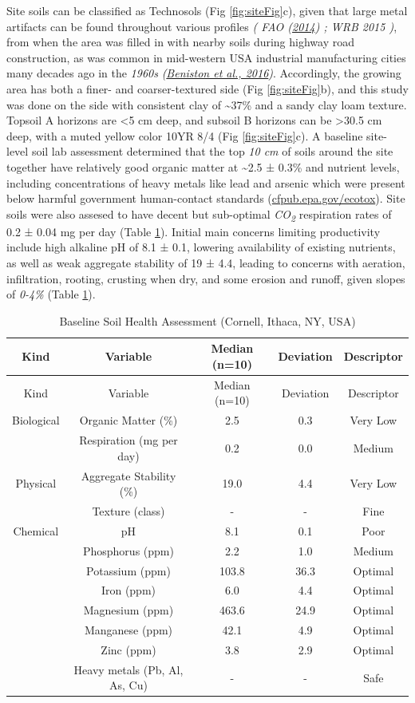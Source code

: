 \documentclass[
  12pt,
]{article}
\begin{document}
Site soils can be classified as Technosols (Fig \ref{fig:siteFig}c), given that large metal artifacts can be found throughout various profiles \emph{( FAO (\protect\hyperlink{ref-fao14}{2014}) ; WRB 2015 )}, from when the area was filled in with nearby soils during highway road construction, as was common in mid-western USA industrial manufacturing cities many decades ago in the \emph{1960s} \emph{(\protect\hyperlink{ref-beniston16}{Beniston et al., 2016})}.
Accordingly, the growing area has both a finer- and coarser-textured side (Fig \ref{fig:siteFig}b),
and this study was done on the side with consistent clay of \textasciitilde37\% and a sandy clay loam texture.
Topsoil A horizons are
\textless5 cm
deep, and subsoil B horizons can be \textgreater30.5 cm
deep, with a muted yellow color 10YR 8/4 (Fig \ref{fig:siteFig}c).
A baseline site-level soil lab assessment determined that the top
\emph{10 cm}
of soils around the site together have relatively good organic matter at
\textasciitilde2.5 ±
0.3\%
and nutrient levels, including concentrations of heavy metals like lead and arsenic which were present below harmful government human-contact standards (\url{cfpub.epa.gov/ecotox}).
Site soils were also assesed to have decent but sub-optimal \emph{CO\textsubscript{2}} respiration rates of
0.2 ±
0.04 mg per day
(Table \ref{tab:chemKbl}).
Initial main concerns limiting productivity include high alkaline pH of
8.1 ±
0.1,
lowering availability of existing nutrients, as well as weak aggregate stability of
19 ±
4.4,
leading to concerns with aeration, infiltration, rooting, crusting when dry, and some erosion and runoff, given slopes of \emph{0-4\%} (Table \ref{tab:chemKbl}).

\begin{longtable}[]{@{}ccccc@{}}
\caption{\label{tab:chemKbl}Baseline Soil Health Assessment (Cornell, Ithaca, NY, USA)}\tabularnewline
\toprule()
Kind & Variable & Median (n=10) & Deviation & Descriptor \\
\midrule()
\endfirsthead
\toprule()
Kind & Variable & Median (n=10) & Deviation & Descriptor \\
\midrule()
\endhead
Biological & Organic Matter (\%) & 2.5 & 0.3 & Very Low \\
& Respiration (mg per day) & 0.2 & 0.0 & Medium \\
Physical & Aggregate Stability (\%) & 19.0 & 4.4 & Very Low \\
& Texture (class) & - & - & Fine \\
Chemical & pH & 8.1 & 0.1 & Poor \\
& Phosphorus (ppm) & 2.2 & 1.0 & Medium \\
& Potassium (ppm) & 103.8 & 36.3 & Optimal \\
& Iron (ppm) & 6.0 & 4.4 & Optimal \\
& Magnesium (ppm) & 463.6 & 24.9 & Optimal \\
& Manganese (ppm) & 42.1 & 4.9 & Optimal \\
& Zinc (ppm) & 3.8 & 2.9 & Optimal \\
& Heavy metals (Pb, Al, As, Cu) & - & - & Safe \\
\bottomrule()
\end{longtable}
\end{document}
